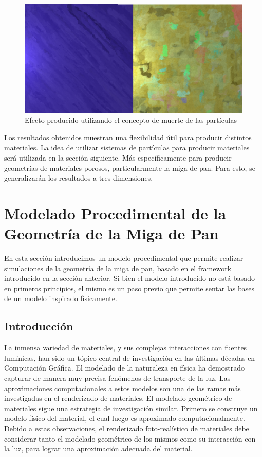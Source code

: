\documentclass[spanish,a4paper,openright,11pt]{book}
\begin{document}
\begin{figure}[t!]
\centering
\includegraphics[scale=0.2]{muerte}
\caption{Efecto producido utilizando el concepto de muerte de las part\'iculas}
\label{muerte}
\end{figure}

Los resultados obtenidos muestran una flexibilidad útil para producir distintos materiales.
La idea de utilizar sistemas de partículas para producir materiales será utilizada en la sección siguiente.
Más específicamente para producir geometrías de materiales porosos, particularmente la miga de pan.
Para esto, se generalizarán los resultados a tres dimensiones.

\section{Modelado Procedimental de la Geometría de la Miga de Pan}
En esta sección introducimos un modelo procedimental que permite realizar simulaciones de la geometr\'ia de la miga de pan, basado en el framework introducido en la secci\'on anterior.
Si bien el modelo introducido no está basado en primeros principios, el mismo es un paso previo que permite sentar las bases de un modelo inspirado físicamente.

\subsection{Introducción}
La inmensa variedad de materiales, y sus complejas interacciones con fuentes lumínicas, han sido un tópico central de investigación en las últimas décadas en Computación Gráfica.
El modelado de la naturaleza en física ha demostrado capturar de manera muy precisa fenómenos de transporte de la luz.
Las aproximaciones computacionales a estos modelos son una de las ramas más investigadas en el renderizado de materiales.
El modelado geométrico de materiales sigue una estrategia de investigación similar. Primero se construye un modelo físico del material, el cual luego es aproximado computacionalmente.
Debido a estas observaciones, el renderizado foto-realístico de materiales debe considerar tanto el modelado geométrico de los mismos como su interacción con la luz, para lograr una aproximación adecuada del material.
\end{document}
